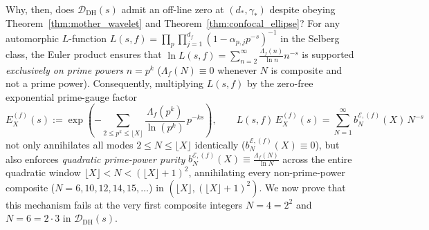 \documentclass[11pt,reqno]{amsart}
\theoremstyle{definition}
\theoremstyle{remark}
\numberwithin{equation}{section}
\newcommand{\DHf}{\mathrm{DH}}
\begin{document}
Why, then, does $\mathcal{D}_{\DHf}(s)$ admit an off-line zero at $(d_*, \gamma_*)$ despite obeying Theorem~\ref{thm:mother_wavelet} and Theorem~\ref{thm:confocal_ellipse}? For any automorphic $L$-function $L(s,f) = \prod_p \prod_{j=1}^{d_f}(1 - \alpha_{p,j}p^{-s})^{-1}$ in the Selberg class, the Euler product ensures that $\ln L(s,f) = \sum_{n=2}^\infty \frac{\Lambda_f(n)}{\ln n}n^{-s}$ is supported \emph{exclusively on prime powers} $n = p^k$ ($\Lambda_f(N) \equiv 0$ whenever $N$ is composite and not a prime power). Consequently, multiplying $L(s,f)$ by the zero-free exponential prime-gauge factor~\cite{missiaen2026paper6}
\begin{equation}\label{eq:exp_prime_gauge_f}
E_X^{(f)}(s) := \exp\!\left(-\sum_{2 \le p^k \le \lfloor X\rfloor} \frac{\Lambda_f(p^k)}{\ln(p^k)}\,p^{-ks}\right), \qquad L(s,f)\,E_X^{(f)}(s) = \sum_{N=1}^{\infty} b_N^{\mathcal{E},(f)}(X)\,N^{-s}
\end{equation}
not only annihilates all modes $2 \le N \le \lfloor X\rfloor$ identically ($b_N^{\mathcal{E},(f)}(X) \equiv 0$), but also enforces \emph{quadratic prime-power purity} $b_N^{\mathcal{E},(f)}(X) \equiv \frac{\Lambda_f(N)}{\ln N}$ across the entire quadratic window $\lfloor X\rfloor < N < (\lfloor X\rfloor + 1)^2$, annihilating every non-prime-power composite ($N = 6, 10, 12, 14, 15, \dots$) in $(\lfloor X\rfloor, (\lfloor X\rfloor+1)^2)$. We now prove that this mechanism fails at the very first composite integers $N = 4 = 2^2$ and $N = 6 = 2\cdot 3$ in $\mathcal{D}_{\DHf}(s)$.
\end{document}
